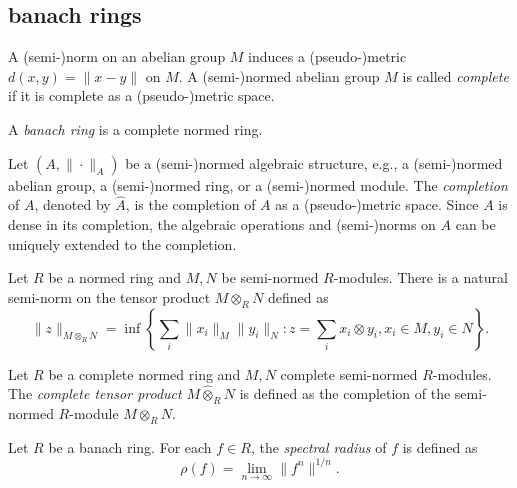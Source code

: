 
\subsection{banach rings}

    \begin{definition}\label{def:complete_semi-normed_abelian_group}
        A (semi-)norm on an abelian group \(M\) induces a (pseudo-)metric \(d(x,y) = \|x - y\|\) on \(M\).
        A (semi-)normed abelian group \(M\) is called \emph{complete} if it is complete as a (pseudo-)metric space.
    \end{definition}

    \begin{definition}\label{def:banach_ring}
        A \emph{banach ring} is a complete normed ring.
    \end{definition}

    \begin{definition}\label{def:completion_of_normed_algebraic_structures}
        Let \((A, \|\cdot\|_A)\) be a (semi-)normed algebraic structure, e.g., a (semi-)normed abelian group, a (semi-)normed ring, or a (semi-)normed module.
        The \emph{completion} of \(A\), denoted by \(\widehat{A}\), is the completion of \(A\) as a (pseudo-)metric space.
        Since \(A\) is dense in its completion, the algebraic operations and (semi-)norms on \(A\) can be uniquely extended to the completion.
    \end{definition}
    
    Let \(R\) be a normed ring and \(M,N\) be semi-normed \(R\)-modules.
    There is a natural semi-norm on the tensor product \(M \otimes_R N\) defined as
    \[
        \|z\|_{M \otimes_R N} = \inf \left\{ \sum_{i} \|x_i\|_M \|y_i\|_N : z = \sum_i x_i \otimes y_i, x_i \in M, y_i \in N \right\}.
    \]

    \begin{definition}\label{def:complete_tensor_product}
        Let \(R\) be a complete normed ring and \(M,N\) complete semi-normed \(R\)-modules.
        The \emph{complete tensor product} \(M \widehat{\otimes}_R N\) is defined as the completion of the semi-normed \(R\)-module \(M \otimes_R N\).
    \end{definition}

    \begin{definition}\label{def:spectral_radius_on_banach_rings}
        Let \(R\) be a banach ring.
        For each \(f \in R\), the \emph{spectral radius} of \(f\) is defined as
        \[
            \rho(f) = \lim_{n \to \infty} \|f^n\|^{1/n}.
        \]
    \end{definition}

